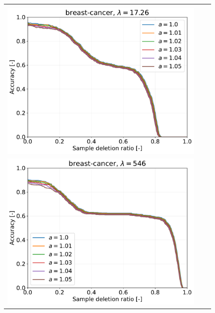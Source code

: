 \begin{figure}[H]
\begin{tabular}{ccc}
		\begin{minipage}[b]{0.3\hsize}\centering {\small Dataset: breast-cancer, $\lambda=n \cdot 10^{-1.5}$}\\\includegraphics[width=0.8\hsize]{fig/table_logistic/breast-cancer-logistic/kernel/kernel_ss_screening_rate_lam17.26_x_n_y_etest.pdf}\end{minipage}
		&
		\begin{minipage}[b]{0.3\hsize}\centering {\small Dataset: breast-cancer, $\lambda=n$}\\\includegraphics[width=0.8\hsize]{fig/table_logistic/breast-cancer-logistic/kernel/kernel_ss_screening_rate_lam546_x_n_y_etest.pdf}\end{minipage}
		\\

\end{tabular}
\end{figure}

